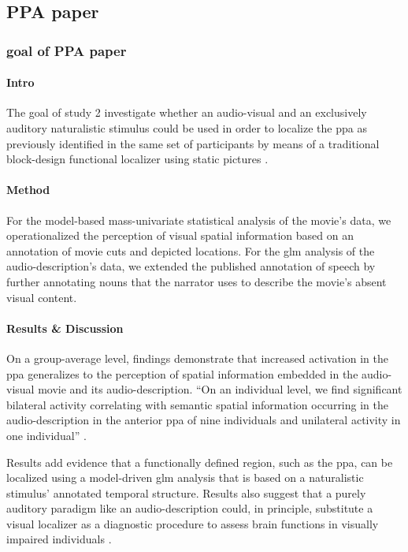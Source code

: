 \subsection{PPA paper}

\subsubsection{goal of PPA paper}


\paragraph{Intro}
The goal of study 2 investigate whether an audio-visual and an exclusively
auditory naturalistic stimulus could be used in order to localize the \ac{ppa}
as previously identified in the same set of participants by means of a
traditional block-design functional localizer using static pictures
\citep{sengupta2016extension}.


\paragraph{Method}
For the model-based mass-univariate statistical analysis of the movie's data, we
operationalized the perception of visual spatial information based on an
annotation of movie cuts and depicted locations.
For the \ac{glm} analysis of the audio-description's data, we extended the
published annotation of speech \citep{haeusler2021speechanno} by further
annotating nouns that the narrator uses to describe the movie's absent visual
content.


\paragraph{Results \& Discussion}
On a group-average level, findings demonstrate that increased activation in the
\ac{ppa} generalizes to the perception of spatial information embedded in the
audio-visual movie and its audio-description.
``On an individual level, we find significant bilateral activity correlating
with semantic spatial information occurring in the audio-description in the
anterior \ac{ppa} of nine individuals and unilateral activity in one
individual'' \citep{haeusler2022processing}.

Results add evidence \citep[cf.][]{bartels2004mapping} that a functionally
defined region, such as the \ac{ppa}, can be localized using a model-driven
\ac{glm} analysis that is based on a naturalistic stimulus' annotated temporal
structure.
Results also suggest that a purely auditory paradigm like an audio-description
could, in principle, substitute a visual localizer as a diagnostic procedure to
assess brain functions in visually impaired individuals
\citep{haeusler2022processing}.


